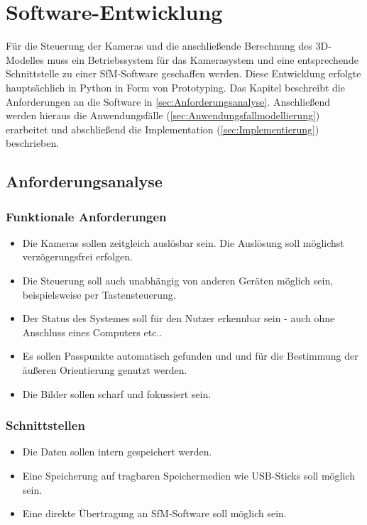 \documentclass[./00_PhotoBox.tex]{subfiles}
\begin{document}
\chapter{Software-Entwicklung}
Für die Steuerung der Kameras und die anschließende Berechnung des 3D-Modelles muss ein Betriebssystem für das Kamerasystem und eine entsprechende Schnittstelle zu einer SfM-Software geschaffen werden. Diese Entwicklung erfolgte hauptsächlich in Python in Form von Prototyping. Das Kapitel beschreibt die Anforderungen an die Software in \autoref{sec:Anforderungsanalyse}. Anschließend werden hieraus die Anwendungsfälle (\autoref{sec:Anwendungsfallmodellierung}) erarbeitet und abschließend die Implementation (\autoref{sec:Implementierung}) beschrieben.

\section{Anforderungsanalyse}
\label{sec:Anforderungsanalyse}

\subsection{Funktionale Anforderungen}
\begin{itemize}
    \item Die Kameras sollen zeitgleich auslösbar sein. Die Auslösung soll möglichst ver\-zögerungs\-frei erfolgen.
    \item Die Steuerung soll auch unabhängig von anderen Geräten möglich sein, beispielsweise per Tastensteuerung.
    \item Der Status des Systemes soll für den Nutzer erkennbar sein - auch ohne Anschluss eines Computers etc..
    \item Es sollen Passpunkte automatisch gefunden und und für die Bestimmung der äußeren Orientierung genutzt werden.
    \item Die Bilder sollen scharf und fokussiert sein.
\end{itemize}

\subsection{Schnittstellen}
\begin{itemize}
    \item Die Daten sollen intern gespeichert werden.
    \item Eine Speicherung auf tragbaren Speichermedien wie USB-Sticks soll möglich sein.
    \item Eine direkte Übertragung an SfM-Software soll möglich sein.
\end{itemize}
\end{document}
